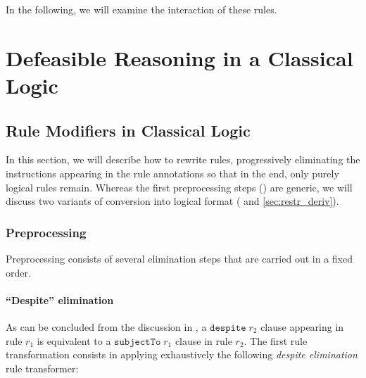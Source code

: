 In the following, we will examine the interaction of these rules.


\section{Defeasible Reasoning in a Classical Logic}\label{sec:defeasible_classical}

\subsection{Rule Modifiers in Classical Logic}\label{sec:rule_modifiers_in_classical_logic}

In this section, we will describe how to rewrite rules, progressively
eliminating the instructions appearing in the rule annotations so that in the
end, only purely logical rules remain. Whereas the first preprocessing steps
() are generic, we will discuss two variants of
conversion into logical format ( and
\ref{sec:restr_deriv}).



\subsubsection{Preprocessing}\label{sec:preprocessing}

Preprocessing consists of several elimination steps that are carried out in a
fixed order.

\paragraph{\textbf{``Despite''  elimination}}

As can be concluded from the discussion in , a
$\mathtt{despite}\; r_2$ clause appearing in rule $r_1$ is equivalent to a
$\mathtt{subjectTo}\; r_1$ clause in rule $r_2$. The first rule transformation
consists in applying exhaustively the following \emph{despite elimination}
rule transformer:

